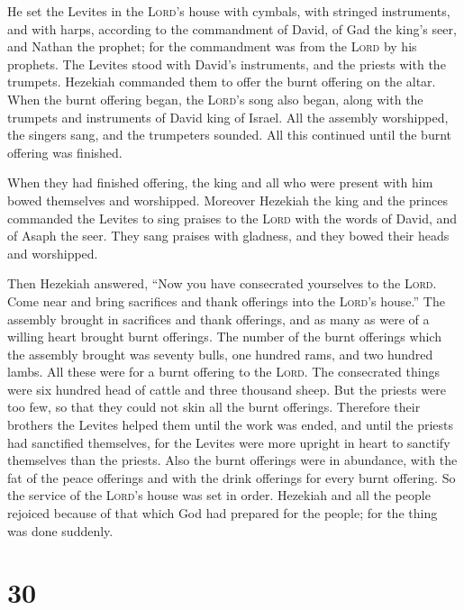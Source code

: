  He set the Levites in the \textsc{Lord}'s house with
cymbals, with stringed instruments, and with harps, according to the
commandment of David, of Gad the king's seer, and Nathan the prophet;
for the commandment was from the \textsc{Lord} by his prophets.
 The Levites stood with David's instruments, and the
priests with the trumpets.  Hezekiah commanded them to
offer the burnt offering on the altar. When the burnt offering began,
the \textsc{Lord}'s song also began, along with the trumpets and
instruments of David king of Israel.  All the assembly
worshipped, the singers sang, and the trumpeters sounded. All this
continued until the burnt offering was finished.

 When they had finished offering, the king and all who
were present with him bowed themselves and worshipped. 
Moreover Hezekiah the king and the princes commanded the Levites to sing
praises to the \textsc{Lord} with the words of David, and of Asaph the
seer. They sang praises with gladness, and they bowed their heads and
worshipped.

 Then Hezekiah answered, ``Now you have consecrated
yourselves to the \textsc{Lord}. Come near and bring sacrifices and
thank offerings into the \textsc{Lord}'s house.'' The assembly brought
in sacrifices and thank offerings, and as many as were of a willing
heart brought burnt offerings.  The number of the burnt
offerings which the assembly brought was seventy bulls, one hundred
rams, and two hundred lambs. All these were for a burnt offering to the
\textsc{Lord}.  The consecrated things were six hundred
head of cattle and three thousand sheep.  But the priests
were too few, so that they could not skin all the burnt offerings.
Therefore their brothers the Levites helped them until the work was
ended, and until the priests had sanctified themselves, for the Levites
were more upright in heart to sanctify themselves than the priests.
 Also the burnt offerings were in abundance, with the fat
of the peace offerings and with the drink offerings for every burnt
offering. So the service of the \textsc{Lord}'s house was set in order.
 Hezekiah and all the people rejoiced because of that
which God had prepared for the people; for the thing was done suddenly.

\hypertarget{section-29}{%
\section{30}\label{section-29}}

